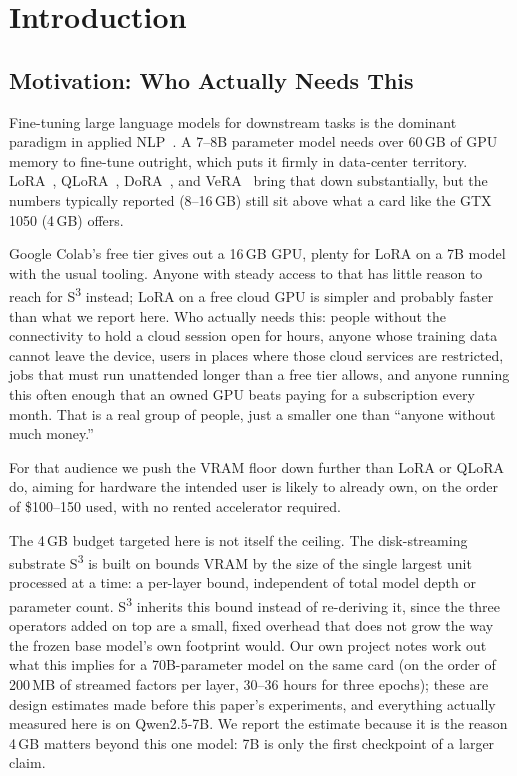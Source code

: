 \documentclass{scpe}
\newcommand{\sthree}{S\textsuperscript{3}}
\begin{document}
\section{Introduction}

\subsection{Motivation: Who Actually Needs This}
\label{sec:motivation}

Fine-tuning large language models for downstream tasks is the dominant paradigm in applied NLP~\cite{hu2021lora,dettmers2023qlora}. A 7--8B parameter model needs over 60\,GB of GPU memory to fine-tune outright, which puts it firmly in data-center territory. LoRA~\cite{hu2021lora}, QLoRA~\cite{dettmers2023qlora}, DoRA~\cite{liu2024dora}, and VeRA~\cite{kopiczko2024vera} bring that down substantially, but the numbers typically reported (8--16\,GB) still sit above what a card like the GTX 1050 (4\,GB) offers.

Google Colab's free tier gives out a 16\,GB GPU, plenty for LoRA on a 7B model with the usual tooling. Anyone with steady access to that has little reason to reach for \sthree{} instead; LoRA on a free cloud GPU is simpler and probably faster than what we report here. Who actually needs this: people without the connectivity to hold a cloud session open for hours, anyone whose training data cannot leave the device, users in places where those cloud services are restricted, jobs that must run unattended longer than a free tier allows, and anyone running this often enough that an owned GPU beats paying for a subscription every month. That is a real group of people, just a smaller one than ``anyone without much money.''

For that audience we push the VRAM floor down further than LoRA or QLoRA do, aiming for hardware the intended user is likely to already own, on the order of \$100--150 used, with no rented accelerator required.

The 4\,GB budget targeted here is not itself the ceiling. The disk-streaming substrate \sthree{} is built on bounds VRAM by the size of the single largest unit processed at a time: a per-layer bound, independent of total model depth or parameter count. \sthree{} inherits this bound instead of re-deriving it, since the three operators added on top are a small, fixed overhead that does not grow the way the frozen base model's own footprint would. Our own project notes work out what this implies for a 70B-parameter model on the same card (on the order of 200\,MB of streamed factors per layer, 30--36 hours for three epochs); these are design estimates made before this paper's experiments, and everything actually measured here is on Qwen2.5-7B. We report the estimate because it is the reason 4\,GB matters beyond this one model: 7B is only the first checkpoint of a larger claim.
\end{document}
